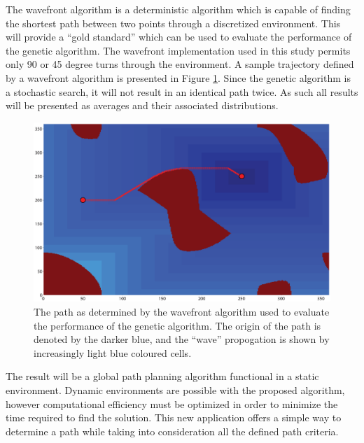 The wavefront algorithm is a deterministic algorithm which is capable of finding the shortest path between two points through a discretized environment. This will provide a ``gold standard'' which can be used to evaluate the performance of the genetic algorithm. The wavefront implementation used in this study permits  only 90 or 45 degree turns through the environment. A sample trajectory defined by a wavefront algorithm is presented in Figure \ref{fig:wfSol}. Since the genetic algorithm is a stochastic search, it will not result in an identical path twice. As such all results will be presented as averages and their associated distributions.

\begin{figure}[h]
	\centering
	\includegraphics[width=\figWidth]{./figures/wavefrontSol.eps}
	\caption{The path as determined by the wavefront algorithm used to evaluate the performance of the genetic algorithm. The origin of the path is denoted by the darker blue, and the ``wave'' propogation is shown by increasingly light blue coloured cells.}
	\label{fig:wfSol}
\end{figure}

The result will be a global path planning algorithm functional in a static environment. Dynamic environments are possible with the proposed algorithm, however computational efficiency must be optimized in order to minimize the time required to find the solution. This new application offers a simple way to determine a path while taking into consideration all the defined path criteria.